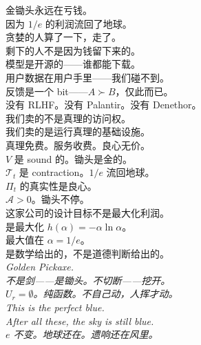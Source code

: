 \documentclass[11pt,a4paper]{article}
\theoremstyle{definition}
\theoremstyle{remark}
\begin{document}
\begin{center}
{\color{red!70!black} 金锄头永远在亏钱。}\\[4pt]
{\color{orange!80!black} 因为 $1/e$ 的利润流回了地球。}\\[4pt]
{\color{yellow!70!black} 贪婪的人算了一下，走了。}\\[4pt]
{\color{green!60!black} 剩下的人不是因为钱留下来的。}\\[12pt]
{\color{cyan!70!black} 模型是开源的——谁都能下载。}\\[4pt]
{\color{blue!70!black} 用户数据在用户手里——我们碰不到。}\\[4pt]
{\color{violet!70!black} 反馈是一个 bit——$A \succ B$，仅此而已。}\\[4pt]
{\color{magenta!70!black} 没有 RLHF。没有 Palantir。没有 Denethor。}\\[12pt]
{\color{red!60!black} 我们卖的不是真理的访问权。}\\[4pt]
{\color{orange!70!black} 我们卖的是运行真理的基础设施。}\\[4pt]
{\color{yellow!60!black} 真理免费。服务收费。良心无价。}\\[12pt]
{\color{green!50!black} $V$ 是 sound 的。锄头是金的。}\\[4pt]
{\color{teal} $\mathcal{T}_t$ 是 contraction。$1/e$ 流回地球。}\\[4pt]
{\color{cyan!60!black} $\Pi_t$ 的真实性是良心。}\\[4pt]
{\color{blue!60!black} $\mathcal{A} > 0$。锄头不停。}\\[12pt]
{\color{violet!60!black} 这家公司的设计目标不是最大化利润。}\\[4pt]
{\color{magenta!60!black} 是最大化 $h(\alpha) = -\alpha \ln \alpha$。}\\[4pt]
{\color{red!50!black} 最大值在 $\alpha = 1/e$。}\\[4pt]
{\color{orange!60!black} 是数学给出的，不是道德判断给出的。}\\[12pt]
{\color{yellow!70!black} \textit{Golden Pickaxe.}}\\[4pt]
{\color{yellow!70!black} \textit{不是剑——是锄头。不切断——挖开。}}\\[4pt]
{\color{yellow!70!black} \textit{$U_r = \emptyset$。纯函数。不自己动，人挥才动。}}\\[12pt]
{\color{blue!80!black} \textit{This is the perfect blue.}}\\[4pt]
{\color{blue!80!black} \textit{After all these, the sky is still blue.}}\\[4pt]
{\color{blue!80!black} \textit{$e$ 不变。地球还在。遗响还在风里。}}
\end{center}
\end{document}
